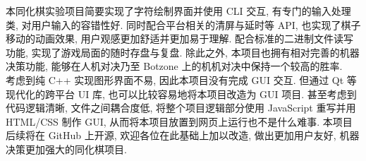 \documentclass[12pt]{article}
\begin{document}
\indent 本同化棋实验项目简要实现了字符绘制界面并使用 CLI 交互, 有专门的输入处理类, 对用户输入的容错性好. 同时配合平台相关的清屏与延时等 API, 也实现了棋子移动的动画效果, 用户观感更加舒适并更加易于理解. 配合标准的二进制文件读写功能, 实现了游戏局面的随时存盘与复盘. 除此之外, 本项目也拥有相对完善的机器决策功能, 能够在人机对决乃至 Botzone 上的机机对决中保持一个较高的胜率. \\
\indent 考虑到纯 C++ 实现图形界面不易, 因此本项目没有完成 GUI 交互. 但通过 Qt 等现代化的跨平台 UI 库, 也可以比较容易地将本项目改造为 GUI 项目. 甚至考虑到代码逻辑清晰, 文件之间耦合度低, 将整个项目逻辑部分使用 JavaScript 重写并用 HTML/CSS 制作 GUI, 从而将本项目放置到网页上运行也不是什么难事. 本项目后续将在 GitHub 上开源, 欢迎各位在此基础上加以改造, 做出更加用户友好, 机器决策更加强大的同化棋项目.
\end{document}
